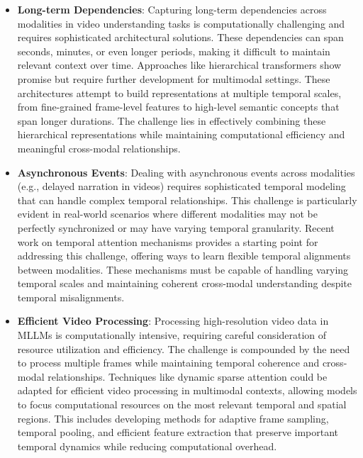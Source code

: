 \begin{itemize}
    \item \textbf{Long-term Dependencies}: Capturing long-term dependencies across modalities in video understanding tasks is computationally challenging and requires sophisticated architectural solutions. These dependencies can span seconds, minutes, or even longer periods, making it difficult to maintain relevant context over time. Approaches like hierarchical transformers \citep{liu2021video} show promise but require further development for multimodal settings. These architectures attempt to build representations at multiple temporal scales, from fine-grained frame-level features to high-level semantic concepts that span longer durations. The challenge lies in effectively combining these hierarchical representations while maintaining computational efficiency and meaningful cross-modal relationships.
    
    \item \textbf{Asynchronous Events}: Dealing with asynchronous events across modalities (e.g., delayed narration in videos) requires sophisticated temporal modeling that can handle complex temporal relationships. This challenge is particularly evident in real-world scenarios where different modalities may not be perfectly synchronized or may have varying temporal granularity. Recent work on temporal attention mechanisms \citep{zhou2018end} provides a starting point for addressing this challenge, offering ways to learn flexible temporal alignments between modalities. These mechanisms must be capable of handling varying temporal scales and maintaining coherent cross-modal understanding despite temporal misalignments.
    
    \item \textbf{Efficient Video Processing}: Processing high-resolution video data in MLLMs is computationally intensive, requiring careful consideration of resource utilization and efficiency. The challenge is compounded by the need to process multiple frames while maintaining temporal coherence and cross-modal relationships. Techniques like dynamic sparse attention \citep{child2019generating} could be adapted for efficient video processing in multimodal contexts, allowing models to focus computational resources on the most relevant temporal and spatial regions. This includes developing methods for adaptive frame sampling, temporal pooling, and efficient feature extraction that preserve important temporal dynamics while reducing computational overhead.
\end{itemize}

